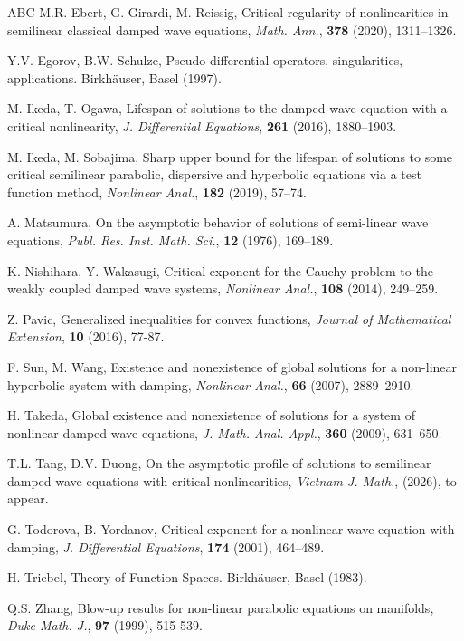 \documentclass[11pt,reqno]{amsart}
\numberwithin{equation}{section}
\theoremstyle{plain}
\begin{document}
\begin{thebibliography}{ABC}
 M.R. Ebert, G. Girardi, M. Reissig, Critical regularity of nonlinearities in semilinear classical damped wave equations, \textit{Math. Ann.}, \textbf{378} (2020), 1311–1326.

 Y.V. Egorov, B.W. Schulze, Pseudo-differential operators, singularities, applications.
Birkhäuser, Basel (1997).

 M. Ikeda, T. Ogawa, Lifespan of solutions to the damped wave equation with a critical nonlinearity, \textit{J. Differential Equations}, \textbf{261} (2016), 1880–1903.

 M. Ikeda, M. Sobajima, Sharp upper bound for the lifespan of solutions to some critical semilinear parabolic, dispersive and hyperbolic equations via a test function method, \textit{Nonlinear Anal.}, \textbf{182} (2019), 57–74.

 A. Matsumura, On the asymptotic behavior of solutions of semi-linear wave equations, \textit{Publ. Res. Inst. Math. Sci.}, \textbf{12} (1976), 169–189.

 K. Nishihara, Y. Wakasugi, Critical exponent for the Cauchy problem to the weakly coupled damped wave systems, \textit{Nonlinear Anal.}, \textbf{108} (2014), 249–259.

 Z. Pavic, Generalized inequalities for convex functions, \textit{Journal of Mathematical Extension}, \textbf{10} (2016), 77-87.

 F. Sun, M. Wang, Existence and nonexistence of global solutions for a non-linear hyperbolic system with damping, \textit{
Nonlinear Anal.}, \textbf{66} (2007), 2889–2910.

 H. Takeda, Global existence and nonexistence of solutions for a system of nonlinear damped wave equations, \textit{J. Math. Anal. Appl.}, \textbf{360} (2009), 631–650.

 T.L. Tang, D.V. Duong, On the asymptotic profile of solutions to semilinear damped wave equations with critical nonlinearities, \textit{Vietnam J. Math.}, (2026), to appear.

 G. Todorova, B. Yordanov, Critical exponent for a nonlinear wave equation with damping, \textit{J. Differential Equations}, {\bf174} (2001), 464–489.

 H. Triebel, Theory of Function Spaces. Birkhäuser, Basel (1983).

 Q.S. Zhang, Blow-up results for non-linear parabolic equations on manifolds, \textit{Duke Math. J.}, \textbf{97} (1999), 515-539.

\end{thebibliography}
\end{document}
